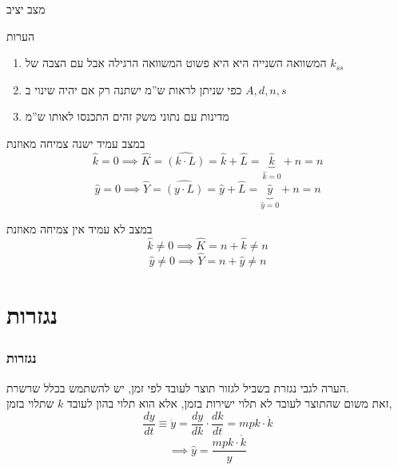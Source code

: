 \documentclass[usenames,dvipsnames, 10pt]{beamer}
\begin{document}
\begin{RTL}
\begin{frame}[allowframebreaks]
\begin{block}{מצב יציב}
    \end{block}
    
    \begin{alertblock}{הערות}
        \begin{enumerate}
            \item המשוואה השנייה היא היא פשוט המשוואה הרגילה אבל עם הצבה של $k_{ss}$
            \item כפי שניתן לראות ש''מ ישתנה רק אם יהיה שינוי ב $A,d,n,s$
            \item מדינות עם נתוני משק זהים התכנסו לאותו ש''מ
        \end{enumerate}
    \end{alertblock}
    \framebreak
    \begin{block}{במצב עמיד ישנה צמיחה מאוזנת}
        \begin{equation*}
            \hat k = 0  \implies \widehat K = \widehat{ \left (k \cdot L \right )} = \hat k + \hat L = \underbrace{\hat k}_{\hat k = 0} + n = n
        \end{equation*}
        \begin{equation*}
            \hat y = 0 \implies \widehat Y = \widehat{ \left (y \cdot L \right )} = \hat y + \hat L = \underbrace{\hat y}_{\hat y = 0} + n = n
        \end{equation*}
        
        
    \end{block}

    \begin{alertblock}{במצב לא עמיד אין צמיחה מאוזנת}
        \begin{equation*}
            \hat k \ne 0  \implies \hat K = n + \hat k \ne n
        \end{equation*}
        \begin{equation*}
            \hat y \ne 0 \implies \hat{Y} = n + \hat y \ne n
        \end{equation*}
    \end{alertblock}
\end{frame}

\section{נגזרות}

\begin{frame}
    \frametitle{נגזרות}
    \begin{alertblock}{הערה לגבי נגזרת}
        בשביל לגזור תוצר לעובד לפי זמן, יש להשתמש בכלל שרשרת. \\
        זאת משום שהתוצר לעובד לא תלוי ישירות בזמן, אלא הוא תלוי בהון לעובד $k$ שתלוי בזמן,
        \begin{equation*}
            \frac{d y}{d t} \equiv \dot y = \frac{d y}{d k } \cdot \frac{d k}{d t} = mpk \cdot \dot k 
        \end{equation*}
        $$\implies \hat y = \frac{mpk \cdot \dot k }{y}$$
    \end{alertblock}
    


\end{frame}
\end{RTL}
\end{document}
